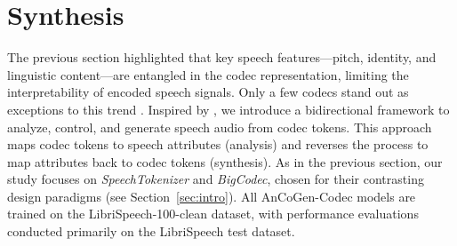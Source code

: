 \documentclass{Interspeech}
\begin{document}
\begin{figure}[h!]
\centering
    \centering
    \label{tab:tasks}
\end{figure}


\section{Synthesis}

The previous section highlighted that key speech features—pitch, identity, and linguistic content—are entangled in the codec representation, limiting the interpretability of encoded speech signals. Only a few codecs stand out as exceptions to this trend \cite{bie2024learning,zheng2024freecodec,ju2024naturalspeech}. Inspired by \cite{polyak2021speech, gengembre2024disentangling, sadok2024ancogen}, we introduce a bidirectional framework to analyze, control, and generate speech audio from codec tokens. This approach maps codec tokens to speech attributes (analysis) and reverses the process to map attributes back to codec tokens (synthesis). As in the previous section, our study focuses on \emph{SpeechTokenizer} and \emph{BigCodec}, chosen for their contrasting design paradigms (see Section~\ref{sec:intro}). All AnCoGen-Codec models are trained on the LibriSpeech-100-clean dataset, with performance evaluations conducted primarily on the LibriSpeech test dataset.
\end{document}
